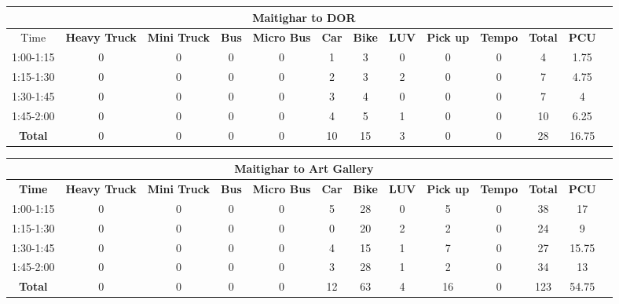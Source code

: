 \begin{landscape}
\centering
\begin{table}[h!]
\centering
\begin{tabular}{|c|c|c|c|c|c|c|c|c|c|c|c|c|}
    \hline
    \multicolumn{12}{|c|}{\textbf{Maitighar to DOR}} \\
    \hline
        Time & \textbf{Heavy Truck} & \textbf{Mini Truck} & \textbf{Bus} & \textbf{Micro Bus} & \textbf{Car} & \textbf{Bike} & \textbf{LUV} & \textbf{Pick up} & \textbf{Tempo} & \textbf{\textbf{Total}} & \textbf{PCU} \\
    \hline
1:00-1:15	&0	&0	&0	&0	&1	&3	&0	&0	&0	&4	&1.75 \\ \hline
1:15-1:30	&0	&0	&0	&0	&2	&3	&2	&0	&0	&7	&4.75 \\ \hline
1:30-1:45	&0	&0	&0	&0	&3	&4	&0	&0	&0	&7	&4 \\ \hline
1:45-2:00	&0	&0	&0	&0	&4	&5	&1	&0	&0	&10	&6.25 \\ \hline
\textbf{Total}	&0	&0	&0	&0	&10	&15	&3	&0	&0	&28	&16.75 \\ \hline
\end{tabular}

\vspace{0.5cm}

\begin{tabular}{|c|c|c|c|c|c|c|c|c|c|c|c|c|}
    \hline
    \multicolumn{12}{|c|}{\textbf{Maitighar to Art Gallery}} \\
    \hline
    \textbf{Time} & \textbf{Heavy Truck} & \textbf{Mini Truck} & \textbf{Bus} & \textbf{Micro Bus} & \textbf{Car} & \textbf{Bike} & \textbf{LUV} & \textbf{Pick up} & \textbf{Tempo} & \textbf{\textbf{Total}} & \textbf{PCU} \\
    \hline
1:00-1:15	&0	&0	&0	&0	&5	&28	&0	&5	&0	&38	&17 \\ \hline
1:15-1:30	&0	&0	&0	&0	&0	&20	&2	&2	&0	&24	&9 \\ \hline
1:30-1:45	&0	&0	&0	&0	&4	&15	&1	&7	&0	&27	&15.75 \\ \hline
1:45-2:00	&0	&0	&0	&0	&3	&28	&1	&2	&0	&34	&13 \\ \hline
\textbf{Total}	&0	&0	&0	&0	&12	&63	&4	&16	&0	&123	&54.75 \\ \hline

\end{tabular}
\end{table}
\end{landscape}

